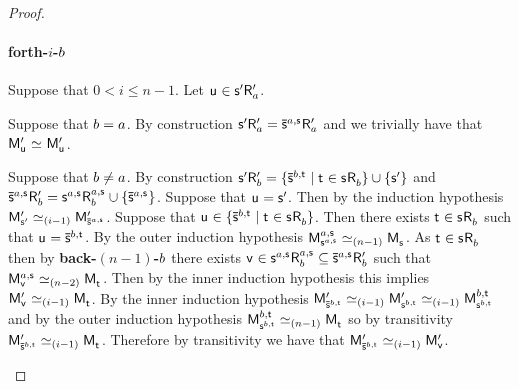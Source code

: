 \begin{proof}
\begin{enumerate}
        \paragraph{forth-$i$-$b$} Suppose that $0 < i \leq n - 1$. Let $\aStateU \in \aStateSP \aAccessibilityP{\agentA}$. 

        Suppose that $b = a$.
        By construction $\aStateSP \aAccessibilityP{\agentA} = \aPStateS[\agentA,\aStateS] \aAccessibilityP{\agentA}$ and we trivially have that $\aPModelP{\aStateU} \bisimilar \aPModelP{\aStateU}$.

        Suppose that $b \neq a$.
        By construction $\aStateSP \aAccessibilityP{\agentB} = \{\aPStateS[\agentB,\aStateT] \mid \aStateT \in \aStateS \aAccessibility{\agentB}\} \cup \{\aStateSP\}$ and $\aPStateS[\agentA,\aStateS] \aAccessibilityP{\agentB} = \aStateS[\agentA,\aStateS] \aAccessibility[\agentA,\aStateS]{\agentB} \cup \{\aPStateS[\agentA,\aStateS]\}$. 
        Suppose that $\aStateU = \aStateSP$. 
        Then by the induction hypothesis $\aPModelP{\aStateSP} \bisimilar[(i-1)] \aPModelP{\aPStateS[\agentA,\aStateS]}$.
        Suppose that $\aStateU \in \{\aPStateS[\agentB,\aStateT] \mid \aStateT \in \aStateS \aAccessibility{\agentB}\}$. 
        Then there exists $\aStateT \in \aStateS \aAccessibility{\agentB}$ such that $\aStateU = \aPStateS[\agentB,\aStateT]$.
        By the outer induction hypothesis $\aPModel[\agentA,\aStateS]{\aStateS[\agentA,\aStateS]} \bisimilar[(n - 1)] \aPModel{\aStateS}$.
        As $\aStateT \in \aStateS \aAccessibility{\agentB}$ then by {\bf back-$(n-1)$-$b$} there exists $\aStateV \in \aStateS[\agentA,\aStateS] \aAccessibility[\agentA,\aStateS]{\agentB} \subseteq \aPStateS[\agentA,\aStateS] \aAccessibilityP{\agentB}$ such that $\aPModel[\agentA,\aStateS]{\aStateV} \bisimilar[(n - 2)] \aPModel{\aStateT}$.
        Then by the inner induction hypothesis this implies $\aPModelP{\aStateV} \bisimilar[(i - 1)] \aPModel{\aStateT}$.
        By the inner induction hypothesis $\aPModelP{\aPStateS[\agentB,\aStateT]} \bisimilar[(i - 1)] \aPModelP{\aStateS[\agentB,\aStateT]} \bisimilar[(i - 1)] \aPModel[\agentB,\aStateT]{\aStateS[\agentB,\aStateT]}$ and by the outer induction hypothesis $\aPModel[\agentB,\aStateT]{\aStateS[\agentB,\aStateT]} \bisimilar[(n - 1)] \aPModel{\aStateT}$ so by transitivity $\aPModelP{\aPStateS[\agentB,\aStateT]} \bisimilar[(i - 1)] \aPModel{\aStateT}$.
        Therefore by transitivity we have that $\aPModelP{\aPStateS[\agentB,\aStateT]} \bisimilar[(i - 1)] \aPModelP{\aStateV}$.


\end{enumerate}
\end{proof}
